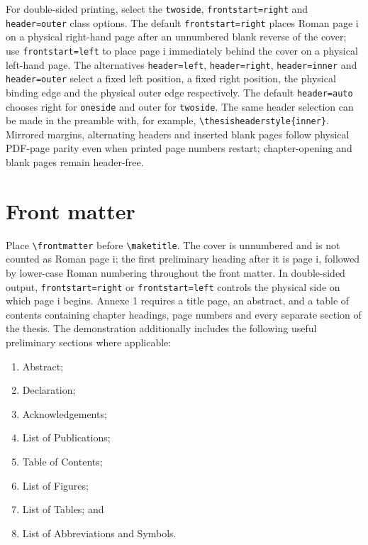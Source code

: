 \documentclass[oneside,header=auto]{liverpoolthesis}
\begin{document}
For double-sided printing, select the \texttt{twoside}, \texttt{frontstart=right} and \texttt{header=outer} class options. The default \texttt{frontstart=right} places Roman page i on a physical right-hand page after an unnumbered blank reverse of the cover; use \texttt{frontstart=left} to place page i immediately behind the cover on a physical left-hand page. The alternatives \texttt{header=left}, \texttt{header=right}, \texttt{header=inner} and \texttt{header=outer} select a fixed left position, a fixed right position, the physical binding edge and the physical outer edge respectively. The default \texttt{header=auto} chooses right for \texttt{oneside} and outer for \texttt{twoside}. The same header selection can be made in the preamble with, for example, \verb|\thesisheaderstyle{inner}|. Mirrored margins, alternating headers and inserted blank pages follow physical PDF-page parity even when printed page numbers restart; chapter-opening and blank pages remain header-free.

\section{Front matter}

Place \verb|\frontmatter| before \verb|\maketitle|. The cover is unnumbered and is not counted as Roman page i; the first preliminary heading after it is page i, followed by lower-case Roman numbering throughout the front matter. In double-sided output, \texttt{frontstart=right} or \texttt{frontstart=left} controls the physical side on which page i begins. Annexe 1 requires a title page, an abstract, and a table of contents containing chapter headings, page numbers and every separate section of the thesis. The demonstration additionally includes the following useful preliminary sections where applicable:

\begin{enumerate}
  \item Abstract;
  \item Declaration;
  \item Acknowledgements;
  \item List of Publications;
  \item Table of Contents;
  \item List of Figures;
  \item List of Tables; and
  \item List of Abbreviations and Symbols.
\end{enumerate}
\end{document}
